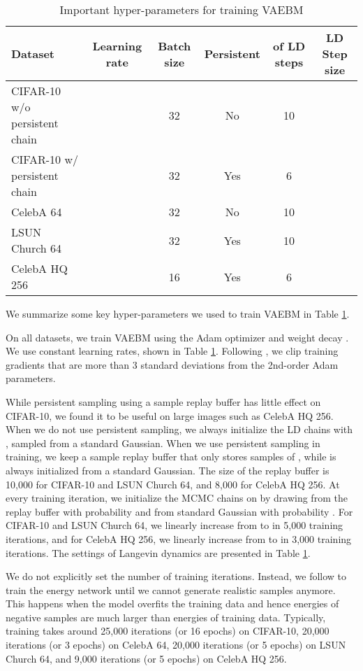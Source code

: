 \documentclass{article} \usepackage{iclr2021_conference,times}
\begin{document}
 \begin{table}[ht]
\small
\caption{Important hyper-parameters for training VAEBM}
\label{table hyperparam}
\begin{center}
\begin{tabular}{lccccc}
Dataset & Learning rate & Batch size &  Persistent &  of LD steps & LD Step size
\\ \hline
CIFAR-10 w/o persistent chain &  & 32 & No &10 & \\
CIFAR-10 w/ persistent chain &  & 32 & Yes &6 & \\
CelebA 64 &  & 32& No &10 & \\
LSUN Church 64 &  & 32 & Yes & 10 &  \\
CelebA HQ 256 &  & 16&Yes &6 & \\
\hline
\end{tabular}
\end{center}
\end{table}

We summarize some key hyper-parameters we used to train VAEBM in Table \ref{table hyperparam}.

On all datasets, we train VAEBM using the Adam optimizer \citep{kingma2014adam} and weight decay . We use constant learning rates, shown in Table \ref{table hyperparam}. Following \citet{du2019implicit}, we clip training gradients that are more than 3 standard deviations from the 2nd-order Adam parameters. 

While persistent sampling using a sample replay buffer has little effect on CIFAR-10, we found it to be useful on large images such as CelebA HQ 256. When we do not use persistent sampling, we always initialize the LD chains with , sampled from a standard Gaussian. When we use persistent sampling in training, we keep a sample replay buffer that only stores samples of , while  is always initialized from a standard Gaussian. The size of the replay buffer is 10,000 for CIFAR-10 and LSUN Church 64, and 8,000 for CelebA HQ 256. At every training iteration, we initialize the MCMC chains on  by drawing  from the replay buffer with probability  and from standard Gaussian with probability . For CIFAR-10 and LSUN Church 64, we linearly increase  from  to  in 5,000 training iterations, and for CelebA HQ 256, we linearly increase  from  to  in 3,000 training iterations. The settings of Langevin dynamics are presented in Table \ref{table hyperparam}.

We do not explicitly set the number of training iterations. Instead, we follow \citet{du2019implicit} to train the energy network until we cannot generate realistic samples anymore. This happens when the model overfits the training data and hence energies of negative samples are much larger than energies of training data. Typically, training takes around 25,000 iterations (or 16 epochs) on CIFAR-10, 20,000 iterations (or 3 epochs) on CelebA 64, 20,000 iterations (or 5 epochs) on LSUN Church 64, and 9,000 iterations (or 5 epochs) on CelebA HQ 256.
\end{document}

